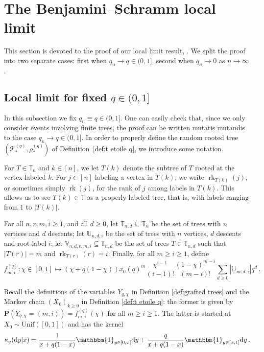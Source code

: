 \documentclass{article}
\theoremstyle{remark}
\newcommand{\bT}{\mathbb{T}}
\newcommand{\abs}[1]{{\left|#1\right|}}
\newcommand{\cT}{\mathcal{T}}
\newcommand{\prob}[1]{\mathbf{P}{\left(#1\right)}}
\newcommand{\bV}{\mathbb{V}}
\newcommand{\bU}{\mathbb{U}}
\newcommand{\Unif}[1]{\mathrm{Unif}{\left(#1\right)}}
\DeclareMathOperator{\rk}{rk}
\begin{document}
\section{The Benjamini--Schramm local limit}
\label{sec:local limit}

This section is devoted to the proof of our local limit result, .
We split the proof into two separate cases: first when $q_n \to q\in(0,1]$, second when $q_n \to 0$ as $n \to \infty$.


\subsection{Local limit for fixed $q \in (0,1]$}

In this subsection we fix $q_n \equiv q \in (0,1]$. 
One can easily check that, since we only consider events involving finite trees, the proof can be written mutatis mutandis to the case $q_n \rightarrow q \in (0,1]$.
In order to properly define the random rooted tree $(\cT_*^{(q)}, \rho_*^{(q)})$ of Definition~\ref{def:t etoile q}, we introduce some notation.

For $T\in\bT_n$ and $k \in [n]$, we let $T(k)$ denote the subtree of $T$ rooted at the vertex labeled $k$.
For $j\in[n]$ labeling a vertex in $T(k)$, we write $\rk_{T(k)}(j)$, or sometimes simply $\rk(j)$, for the rank of $j$ among labels in $T(k)$.
This allows us to see $T(k) \in \bT$ as a properly labeled tree, that is, with labels ranging from $1$ to $\abs{T(k)}$.

For all $n,r,m,i \geq 1$, and all $d \geq 0$, let $\bT_{n,d} \subseteq \bT_n$ be the set of trees with $n$ vertices and $d$ descents;
let $\bU_{n,d,i}$ be the set of trees with $n$ vertices, $d$ descents and root-label $i$;
let $\bV_{n,d,r,m,i} \subseteq \bT_{n,d}$ be the set of trees $T \in \bT_{n,d}$ such that $|T(r)|=m$ and $\rk_{T(r)}(r)=i$.
Finally, for all $m \geq i \geq 1$, define 
\begin{equation}\label{eq: function fmi}
    f_{m,i}^{(q)}: \chi \in[0,1] \mapsto \left(\chi+q(1-\chi)\right) x_0(q)^m \frac{\chi^{i-1}}{(i-1)!}\frac{(1-\chi)^{m-i}}{(m-i)!} \sum\limits_{d \geq 0} \abs{\bU_{m,d,i}}q^d \,.
\end{equation}

Recall the definitions of the variables $Y_{q,\chi}$ in Definition \ref{def:grafted trees} and the Markov chain 
$(X_k)_{k \geq 0}$ in Definition \ref{def:t etoile q}: the former is given by
$\prob{Y_{q,\chi}=(m,i)}=f_{m,i}^{(q)}(\chi)$ for all $m \geq i \geq 1$. The latter is started at $X_0 \sim \Unif{[0,1]}$ and has the kernel
\[
        \kappa_q(\mathrm dy|x)=\frac{1}{x+q(1-x)} \mathbbm{1}_{y \in [0,x]} \mathrm dy + \frac{q}{x+q(1-x)} \mathbbm{1}_{y \in [x,1]} \mathrm dy \,.
    \]
\end{document}
